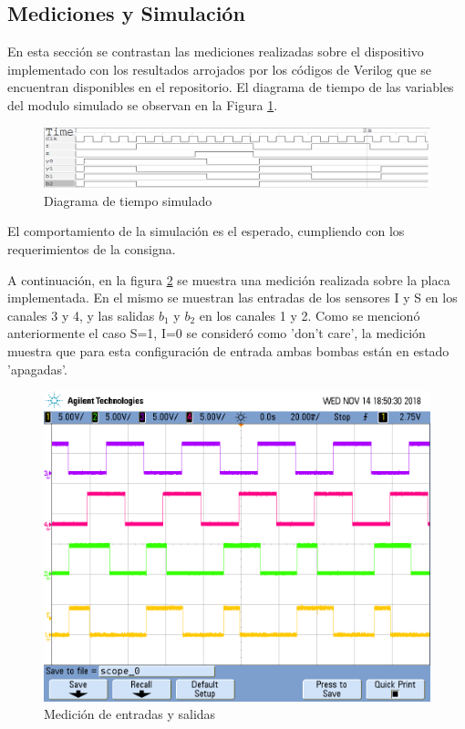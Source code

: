 \documentclass[10pt,a4paper]{article}
\begin{document}
\subsection*{Mediciones y Simulación}

En esta sección se contrastan las mediciones realizadas sobre el dispositivo implementado con los resultados arrojados por los códigos de Verilog que se encuentran disponibles en el repositorio. El diagrama de tiempo de las variables del modulo simulado se observan en la Figura \ref{1_fig_verilog_moore}.


\begin{figure}[H]
\centering
\includegraphics[scale=0.45]{images/time_diagram_moore}
\caption{Diagrama de tiempo simulado}
\label{1_fig_verilog_moore}
\end{figure}

El comportamiento de la simulación es el esperado, cumpliendo con los requerimientos de la consigna.

A continuación, en la figura \ref{1_fig_medicion_moore} se muestra una medición realizada sobre la placa implementada. En el mismo se muestran las entradas de los sensores I y S en los canales 3 y 4, y las salidas $b_1$ y $b_2$ en los canales 1 y 2. Como se mencionó anteriormente el caso S=1, I=0 se consideró como 'don't care', la medición muestra que para esta configuración de entrada ambas bombas están en estado 'apagadas'.

\begin{figure}[H]
\centering
\includegraphics[scale=0.3]{images/medicion_ej1_moore}
\caption{Medición de entradas y salidas}
\label{1_fig_medicion_moore}
\end{figure}
\end{document}
